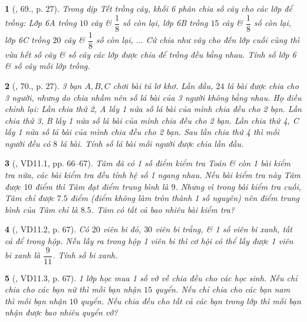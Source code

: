 \documentclass{article}
\newtheorem{baitoan}{}
\begin{document}
\begin{baitoan}[\cite{Binh_Toan_6_tap_2}, 69., p. 27]
	Trong dịp Tết trồng cây, khối 6 phân chia số cây cho các lớp để trồng: Lớp 6A trồng $10$ cây \& $\dfrac{1}{8}$ số còn lại, lớp 6B trồng $15$ cây \& $\dfrac{1}{8}$ số còn lại, lớp 6C trồng $20$ cây \& $\dfrac{1}{8}$ số còn lại, $\ldots$ Cứ chia như vây cho đến lớp cuối cùng thì vừa hết số cây \& số cây các lớp được chia để trồng đều bằng nhau. Tính số lớp 6 \& số cây mỗi lớp trồng.
\end{baitoan}

\begin{baitoan}[\cite{Binh_Toan_6_tap_2}, 70., p. 27]
	3 bạn $A,B,C$ chơi bài tú lơ khơ. Lần đầu, $24$ lá bài được chia cho 3 người, nhưng do chia nhầm nên số lá bài của 3 người không bằng nhau. Họ điều chỉnh lại: Lần chia thứ 2, A lấy 1 nửa số lá bài của mình chia đều cho 2 bạn. Lần chia thứ 3, B lấy 1 nửa số lá bài của mình chia đều cho 2 bạn. Lần chia thứ 4, C lấy 1 nửa số lá bài của mình chia đều cho 2 bạn. Sau lần chia thứ 4 thì mỗi người đều có $8$ lá bài. Tính số lá bài mỗi người được chia lần đầu.
\end{baitoan}

\begin{baitoan}[\cite{TLCT_THCS_Toan_6_so_hoc}, VD11.1, pp. 66--67]
	Tâm đã có 1 số điểm kiểm tra Toán \& còn 1 bài kiểm tra nữa, các bài kiểm tra đều tính hệ số 1 ngang nhau. Nếu bài kiểm tra này Tâm được $10$ điểm thì Tâm đạt điểm trung bình là $9$. Nhưng vì trong bài kiểm tra cuối, Tâm chỉ được $7.5$ điểm (điểm không làm tròn thành 1 số nguyên) nên điểm trung bình của Tâm chỉ là $8.5$. Tâm có tất cả bao nhiêu bài kiểm tra?
\end{baitoan}

\begin{baitoan}[\cite{TLCT_THCS_Toan_6_so_hoc}, VD11.2, p. 67]
	Có $20$ viên bi đỏ, $30$ viên bi trắng, \& 1 số viên bi xanh, tất cả để trong hộp. Nếu lấy ra trong hộp 1 viên bi thì cơ hội có thể lấy được 1 viên bi xanh là $\dfrac{9}{11}$. Tính số bi xanh.
\end{baitoan}

\begin{baitoan}[\cite{TLCT_THCS_Toan_6_so_hoc}, VD11.3, p. 67]
	1 lớp học mua 1 số vở về chia đều cho các học sinh. Nếu chỉ chia cho các bạn nữ thì mỗi bạn nhận $15$ quyển. Nếu chỉ chia cho các bạn nam thì mỗi bạn nhận $10$ quyển. Nếu chia đều cho tất cả các bạn trong lớp thì mỗi bạn nhận được bao nhiêu quyển vở?
\end{baitoan}
\end{document}
